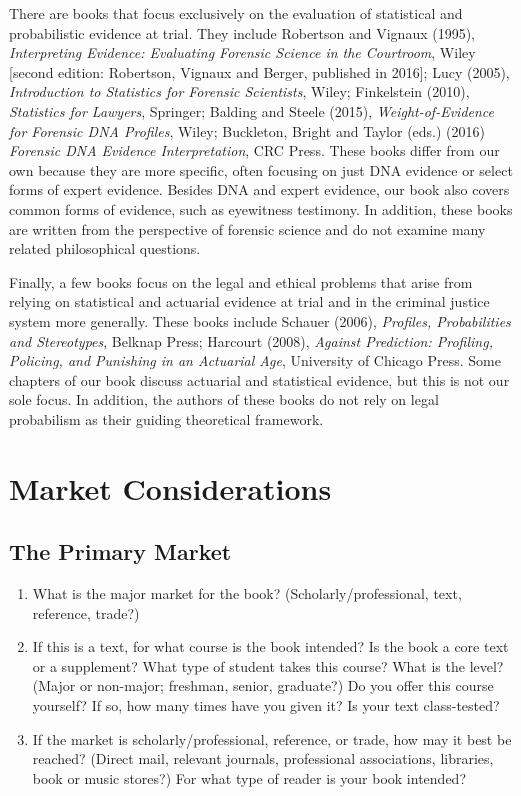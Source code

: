 \documentclass[
  10pt,
  dvipsnames,enabledeprecatedfontcommands]{scrartcl}
\begin{document}
There are books that focus exclusively on the evaluation of statistical
and probabilistic evidence at trial. They include Robertson and Vignaux
(1995),
\textit{Interpreting Evidence: Evaluating Forensic Science in the Courtroom},
Wiley {[}second edition: Robertson, Vignaux and Berger, published in
2016{]}; Lucy (2005),
\textit{Introduction to Statistics for Forensic Scientists}, Wiley;
Finkelstein (2010), \textit{Statistics for Lawyers}, Springer; Balding
and Steele (2015),
\textit{Weight-of-Evidence for Forensic DNA Profiles}, Wiley; Buckleton,
Bright and Taylor (eds.) (2016)
\textit{Forensic DNA Evidence Interpretation}, CRC Press. These books
differ from our own because they are more specific, often focusing on
just DNA evidence or select forms of expert evidence. Besides DNA and
expert evidence, our book also covers common forms of evidence, such as
eyewitness testimony. In addition, these books are written from the
perspective of forensic science and do not examine many related
philosophical questions.

Finally, a few books focus on the legal and ethical problems that arise
from relying on statistical and actuarial evidence at trial and in the
criminal justice system more generally. These books include Schauer
(2006), \textit{Profiles, Probabilities and Stereotypes}, Belknap Press;
Harcourt (2008),
\textit{Against Prediction: Profiling, Policing, and Punishing in an Actuarial Age},
University of Chicago Press. Some chapters of our book discuss actuarial
and statistical evidence, but this is not our sole focus. In addition,
the authors of these books do not rely on legal probabilism as their
guiding theoretical framework.

\hypertarget{market-considerations}{%
\section{Market Considerations}\label{market-considerations}}

\hypertarget{the-primary-market}{%
\subsection{The Primary Market}\label{the-primary-market}}

\footnotesize

\begin{enumerate}
\def\labelenumi{\arabic{enumi}.}
\item
  What is the major market for the book? (Scholarly/professional, text,
  reference, trade?)
\item
  If this is a text, for what course is the book intended? Is the book a
  core text or a supplement? What type of student takes this course?
  What is the level? (Major or non-major; freshman, senior, graduate?)
  Do you offer this course yourself? If so, how many times have you
  given it? Is your text class-tested?
\item
  If the market is scholarly/professional, reference, or trade, how may
  it best be reached? (Direct mail, relevant journals, professional
  associations, libraries, book or music stores?) For what type of
  reader is your book intended?
\end{enumerate}
\end{document}
